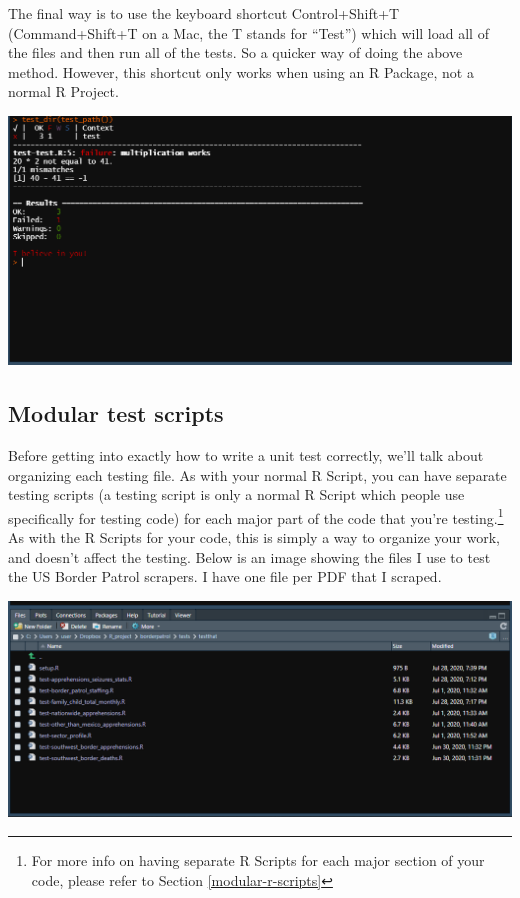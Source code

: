 \documentclass[
  12pt,
]{book}
\begin{document}
The final way is to use the keyboard shortcut Control+Shift+T (Command+Shift+T on a Mac, the T stands for ``Test'') which will load all of the files and then run all of the tests. So a quicker way of doing the above method. However, this shortcut only works when using an R Package, not a normal R Project.

\includegraphics{images/test_summary.PNG}

\hypertarget{modular-test-scripts}{%
\subsection{Modular test scripts}\label{modular-test-scripts}}

Before getting into exactly how to write a unit test correctly, we'll talk about organizing each testing file. As with your normal R Script, you can have separate testing scripts (a testing script is only a normal R Script which people use specifically for testing code) for each major part of the code that you're testing.\footnote{For more info on having separate R Scripts for each major section of your code, please refer to Section \ref{modular-r-scripts}} As with the R Scripts for your code, this is simply a way to organize your work, and doesn't affect the testing. Below is an image showing the files I use to test the US Border Patrol scrapers. I have one file per PDF that I scraped.

\includegraphics{images/test_file_setup.PNG}
\end{document}
